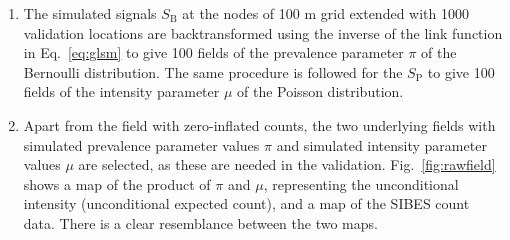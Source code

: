 \documentclass[review]{elsarticle}
\begin{document}
\begin{enumerate}
\item

The simulated signals $S_{\mathrm{B}}$ at the nodes of 100 m grid extended with 1000 validation locations are backtransformed using the inverse of the link function in Eq.~\ref{eq:glsm} to give 100 fields of the prevalence parameter $\pi$ of the Bernoulli distribution. The same procedure is followed for the $S_{\mathrm{P}}$ to give 100 fields of the intensity parameter $\mu$ of the Poisson distribution.

\item
%

Apart from the field with zero-inflated counts, the two underlying fields with simulated prevalence parameter values $\pi$ and simulated intensity parameter values $\mu$ are selected, as these are needed in the validation. Fig.~\ref{fig:rawfield} shows a map of the product of $\pi$ and $\mu$, representing the unconditional intensity (unconditional expected count), and a map of the SIBES count data. There is a clear resemblance between the two maps.


\end{enumerate}
\end{document}

